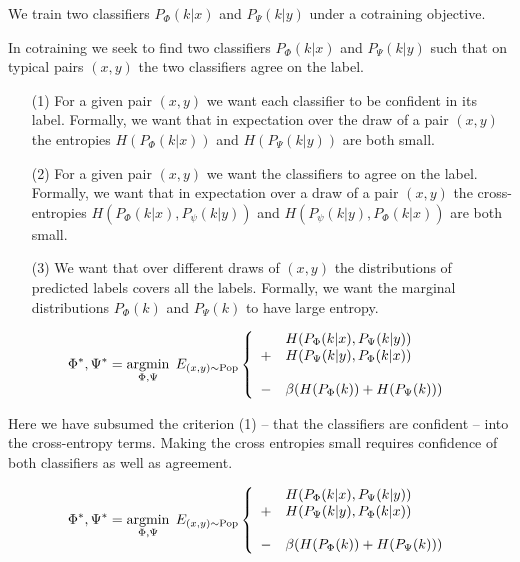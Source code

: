 {{\vfill
We train two classifiers $P_\Phi(k|x)$ and $P_\Psi(k|y)$ under a cotraining objective.


{\huge
In cotraining we seek to find two classifiers $P_\Phi(k|x)$ and $P_\Psi(k|y)$ such that on typical pairs $(x,y)$ the two classifiers agree on the label.

\begin{itemize}
\item[(1)] For a given pair $(x,y)$ we want each classifier to be confident in its label.  Formally, we want that in expectation over the draw of a pair $(x,y)$ the entropies
$H(P_\Phi(k|x))$ and $H(P_\Psi(k|y))$ are both small.

\item[(2)] For a given pair $(x,y)$ we want the classifiers to agree on the label. Formally, we want that in expectation over a draw of a pair $(x,y)$ the cross-entropies
$H(P_\Phi(k|x),P_\psi(k|y))$ and $H(P_\psi(k|y),P_\Phi(k|x))$ are both small.

\item[(3)] We want that over different draws of $(x,y)$ the distributions of predicted labels covers all the labels.  Formally, we want the marginal distributions $P_\Phi(k)$
and $P_\Psi(k)$ to have large entropy.
\end{itemize}
}



$$\Phi^*,\Psi^* = \operatorname*{argmin}_{\Phi,\Psi}\;E_{(x,y)\sim \mathrm{Pop}} \left\{\begin{array}{cl}&H(P_\Phi(k|x),P_\Psi(k|y)) \\ +& H(P_\Psi(k|y),P_\Phi(k|x)) \\ \\ - & \beta(H(P_\Phi(k)) + H(P_\Psi(k)))\end{array}\right.$$

\vfill
Here we have subsumed the criterion (1) -- that the classifiers are confident -- into the cross-entropy terms.  Making the cross entropies small requires confidence of both classifiers as well as agreement.


$$\Phi^*,\Psi^* = \operatorname*{argmin}_{\Phi,\Psi}\;E_{(x,y)\sim \mathrm{Pop}} \left\{\begin{array}{cl}&H(P_\Phi(k|x),P_\Psi(k|y)) \\ +& H(P_\Psi(k|y),P_\Phi(k|x)) \\ \\ - & \beta(H(P_\Phi(k)) + H(P_\Psi(k)))\end{array}\right.$$

}}
